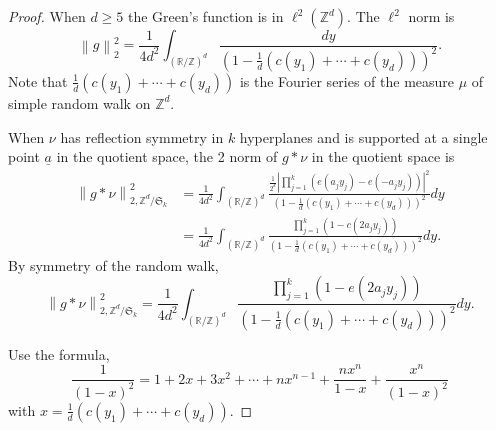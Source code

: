 \documentclass[a4paper, 12pt, notitlepage]{amsart}
\newcommand{\bR}{\mathbb{R}}
\newcommand{\zed}{\mathbb{Z}}
\newcommand{\ua}{\underline{a}}
\newcommand{\fS}{{\mathfrak{S}}}
\theoremstyle{remark}
\begin{document}
\begin{proof}
 When $d \geq 5$ the Green's function is in $\ell^2(\zed^d)$.  The $\ell^2$ norm is
 \begin{equation}
  \left\|g\right\|_2^2 = \frac{1}{4d^2} \int_{(\bR/\zed)^d} \frac{dy}{\left(1 - \frac{1}{d}\left(c(y_1) + \cdots + c(y_d) \right)\right)^2}.
 \end{equation}
 Note that $\frac{1}{d} \left(c(y_1) + \cdots + c(y_d) \right)$ is the Fourier series of the measure $\mu$ of simple random walk on $\zed^d$.
 
 
When $\nu$ has reflection symmetry in $k$ hyperplanes and is supported at a single point $\ua$ in the quotient space, the 2 norm of $g*\nu$ in the quotient space is
\begin{align*}
 \left\|g*\nu\right\|_{2, \zed^d/\fS_k}^2 &= \frac{1}{4d^2} \int_{(\bR/\zed)^d} \frac{\frac{1}{2^k}\left|\prod_{j=1}^k (e(a_j y_j)-e(-a_jy_j)) \right|^2}{\left(1 - \frac{1}{d}\left(c(y_1) + \cdots + c(y_d) \right)\right)^2}dy\\
 &=\frac{1}{4d^2} \int_{(\bR/\zed)^d} \frac{\prod_{j=1}^k (1-c(2a_jy_j))}{\left(1 - \frac{1}{d}\left(c(y_1) + \cdots + c(y_d) \right)\right)^2}dy.
\end{align*}
By symmetry of the random walk,
\begin{equation}\label{2_norm_formula}
 \left\|g*\nu\right\|_{2, \zed^d/\fS_k}^2 =\frac{1}{4d^2} \int_{(\bR/\zed)^d} \frac{\prod_{j=1}^k (1-e(2a_jy_j))}{\left(1 - \frac{1}{d}\left(c(y_1) + \cdots + c(y_d) \right)\right)^2}dy.
\end{equation}


Use the formula,
\begin{equation}
 \frac{1}{(1-x)^2} = 1 + 2x + 3x^2 + \cdots + nx^{n-1} + \frac{nx^n}{1-x} + \frac{x^n}{(1-x)^2}
\end{equation}
with $x = \frac{1}{d}\left(c(y_1) + \cdots + c(y_d) \right)$. 




\end{proof}
\end{document}
